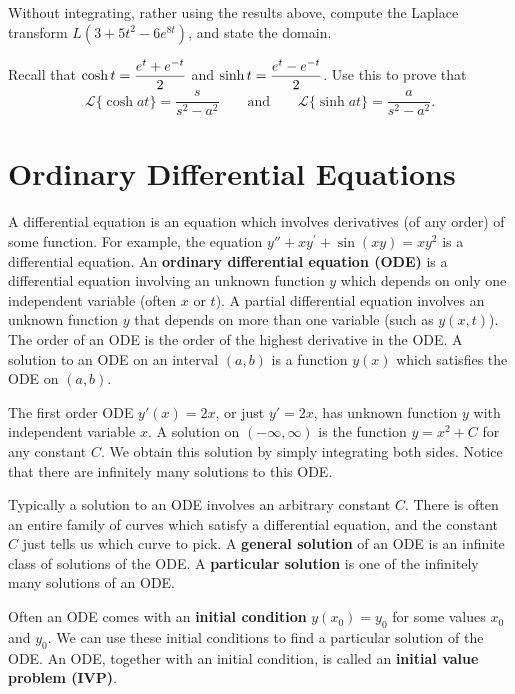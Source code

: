 \begin{problem}
Without integrating, rather using the results above, compute the Laplace transform $L(3+5t^2-6e^{8t})$, and state the domain. 
\end{problem}

\begin{problem}
Recall that $\displaystyle\cosh t = \frac{e^t+e^{-t}}{2}$ and $\displaystyle\sinh t = \frac{e^t-e^{-t}}{2}$. 
Use this to prove that $$\mathscr{L}\{\cosh a t\} = \frac{s}{s^2-a^2}\quad \quad \text{and}\quad\quad\mathscr{L}\{\sinh a t\} = \frac{a}{s^2-a^2}.$$
\end{problem}



\section{Ordinary Differential Equations}
A differential equation is an equation which involves derivatives (of any order) of some function.  For example, the equation $y''+xy^\prime+\sin(xy)=xy^2$ is a differential equation. An \textbf{ordinary differential equation (ODE)} is a differential equation involving an unknown function $y$ which depends on only one independent variable (often $x$ or $t$). A partial differential equation involves an unknown function $y$ that depends on more than one variable (such as $y(x,t)$). The order of an ODE is the order of the highest derivative in the ODE. A solution to an ODE on an interval $(a,b)$ is a function $y(x)$ which satisfies the ODE on $(a,b)$. 
\begin{example}
The first order ODE $y'(x) = 2x$, or just $y'=2x$, has unknown function $y$ with independent variable $x$. A solution on $(-\infty,\infty)$ is the function $y=x^2+C$ for any constant $C$. We obtain this solution by simply integrating both sides. Notice that there are infinitely many solutions to this ODE. 
\end{example}

Typically a solution to an ODE involves an arbitrary constant $C$. There is often an entire family of curves which satisfy a differential equation, and the constant $C$ just tells us which curve to pick. A \textbf{general solution} of an ODE is an infinite class of solutions of the ODE. A \textbf{particular solution} is one of the infinitely many solutions of an ODE. 

Often an ODE comes with an \textbf{initial condition} $y(x_0)=y_0$ for some values $x_0$ and $y_0$. We can use these initial conditions to find a particular solution of the ODE. An ODE, together with an initial condition, is called an \textbf{initial value problem (IVP)}.  

